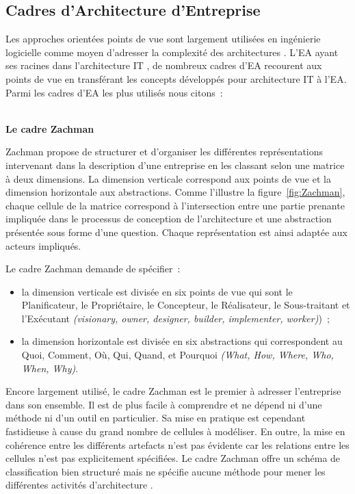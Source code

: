 	\subsection{Cadres d'Architecture d'Entreprise}

Les approches orientées points de vue sont largement utilisées en ingénierie logicielle comme moyen d'adresser la complexité des architectures \cite{steen2004supporting}. L'EA ayant ses racines dans l'architecture IT \cite{winter2008enterprise}, de nombreux cadres d'EA recourent aux points de vue en transférant les concepts développés pour architecture IT à l'EA. Parmi les cadres d'EA les plus utilisés nous citons~:
\\\

\textbf{Le cadre Zachman}

Zachman \cite{zachman1987framework} propose de structurer et d'organiser les différentes représentations intervenant dans la description d'une entreprise en les classant selon une matrice à deux dimensions. La dimension verticale correspond aux points de vue et la dimension horizontale aux abstractions. Comme l'illustre la figure~\ref{fig:Zachman}, chaque cellule de la matrice correspond à l'intersection entre une partie prenante impliquée dans le processus de conception de l'architecture et une abstraction présentée sous forme d'une question. Chaque représentation est ainsi adaptée aux acteurs impliqués. 


Le cadre Zachman demande de spécifier~:

	\begin{itemize}

\item la dimension verticale est divisée en six points de vue qui sont le Planificateur, le Propriétaire, le Concepteur, le Réalisateur, le Sous-traitant et l'Exécutant \textit{(visionary, owner, designer, builder, implementer, worker)})~;

\item la dimension horizontale est divisée en six abstractions qui correspondent au Quoi, Comment, Où, Qui, Quand, et Pourquoi \textit{(What, How, Where, Who, When, Why)}.
	\end{itemize}	

Encore largement utilisé, le cadre Zachman est le premier à adresser l'entreprise dans son ensemble. Il est de plus facile à comprendre et ne dépend ni d'une méthode ni d'un outil en particulier. Sa mise en pratique est cependant fastidieuse à cause du grand nombre de cellules à modéliser. En outre, la mise en cohérence entre les différents artefacts n'est pas évidente car les relations entre les cellules n'est pas explicitement spécifiées. Le cadre Zachman offre un schéma de classification bien structuré mais ne spécifie aucune méthode pour mener les différentes activités d'architecture \cite{lankhorst2013enterprise}.


